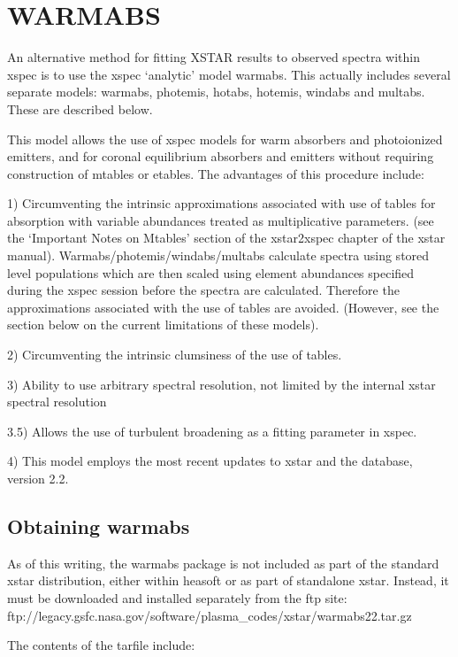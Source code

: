 \chapter{WARMABS}
\label{sec:warmabs}

An alternative method for fitting XSTAR results to observed spectra
within xspec is to use the xspec `analytic' model warmabs.
This actually includes several separate models: warmabs, photemis, 
hotabs, hotemis, windabs and multabs.  These are described below.

This model allows the use of xspec models for warm absorbers and photoionized emitters,
and for coronal equilibrium absorbers and emitters
without requiring construction of mtables or etables.  The advantages 
of this procedure include:

1) Circumventing the intrinsic approximations associated with 
use of tables for absorption with variable abundances treated 
as multiplicative parameters.  (see the `Important Notes on Mtables' section of the 
xstar2xspec chapter of the xstar manual).   Warmabs/photemis/windabs/multabs  
calculate spectra using stored level populations which are then scaled using 
element abundances specified during the xspec session before the spectra are 
calculated.  Therefore the approximations associated with the use of 
tables are avoided.  (However, see the section below on the current 
limitations of these models).

2) Circumventing the intrinsic clumsiness of the use of tables.

3) Ability to use arbitrary spectral resolution, not limited 
by the internal xstar spectral resolution

3.5) Allows the use of turbulent broadening as a fitting parameter in 
xspec.

4) This model employs the most recent updates to xstar and the database, 
version 2.2. 


\section{Obtaining warmabs}

As of this writing, the warmabs package is not included as 
part of the standard xstar distribution, either within heasoft 
or as part of standalone xstar.  Instead, it must be downloaded 
and installed separately from the ftp site:
ftp://legacy.gsfc.nasa.gov/software/plasma\_codes/xstar/warmabs22.tar.gz

The contents of the tarfile include:

